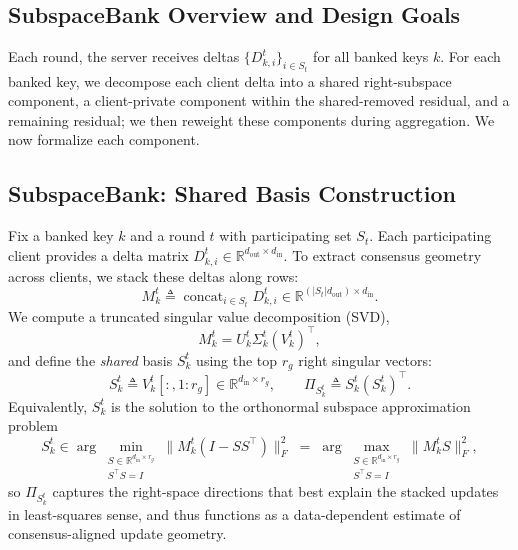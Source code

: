 \documentclass{article}
\theoremstyle{plain}
\theoremstyle{definition}
\theoremstyle{remark}
\begin{document}
\subsection{SubspaceBank Overview and Design Goals}
\label{sec:method-overview}

Each round, the server receives deltas $\{D_{k,i}^t\}_{i\in S_t}$ for all banked keys $k$. For each banked key, we decompose each client delta into a shared right-subspace component, a client-private component within the shared-removed residual, and a remaining residual; we then reweight these components during aggregation. We now formalize each component.

\subsection{SubspaceBank: Shared Basis Construction}
\label{sec:shared-basis}

Fix a banked key $k$ and a round $t$ with participating set $S_t$. Each participating client provides a delta matrix $D_{k,i}^t \in \mathbb{R}^{d_{\mathrm{out}}\times d_{\mathrm{in}}}$. To extract consensus geometry across clients, we stack these deltas along rows:
\begin{equation}
  M_k^t \triangleq \operatorname{concat}_{i\in S_t} D_{k,i}^t
  \in\mathbb{R}^{(|S_t|d_{\mathrm{out}})\times d_{\mathrm{in}}}.
  \label{eq:stack_def}
\end{equation}
We compute a truncated singular value decomposition (SVD),
\[
  M_k^t = U_k^t \Sigma_k^t (V_k^t)^\top,
\]
and define the \emph{shared} basis $S_k^t$ using the top $r_g$ right singular vectors:
\begin{equation}
  S_k^t \triangleq V_k^t[:,1{:}r_g]\in\mathbb{R}^{d_{\mathrm{in}}\times r_g},
  \qquad
  \Pi_{S_k^t}\triangleq S_k^t (S_k^t)^\top.
  \label{eq:shared_basis}
\end{equation}
Equivalently, $S_k^t$ is the solution to the orthonormal subspace approximation problem
\begin{equation}
  S_k^t \in \arg\min_{\substack{S\in\mathbb{R}^{d_{\mathrm{in}}\times r_g}\\ S^\top S = I}}
  \big\|M_k^t(I-SS^\top)\big\|_F^2
  \;=\;
  \arg\max_{\substack{S\in\mathbb{R}^{d_{\mathrm{in}}\times r_g}\\ S^\top S = I}}
  \big\|M_k^t S\big\|_F^2,
  \label{eq:shared_opt}
\end{equation}
so $\Pi_{S_k^t}$ captures the right-space directions that best explain the stacked updates in least-squares sense, and thus functions as a data-dependent estimate of consensus-aligned update geometry.
\end{document}
